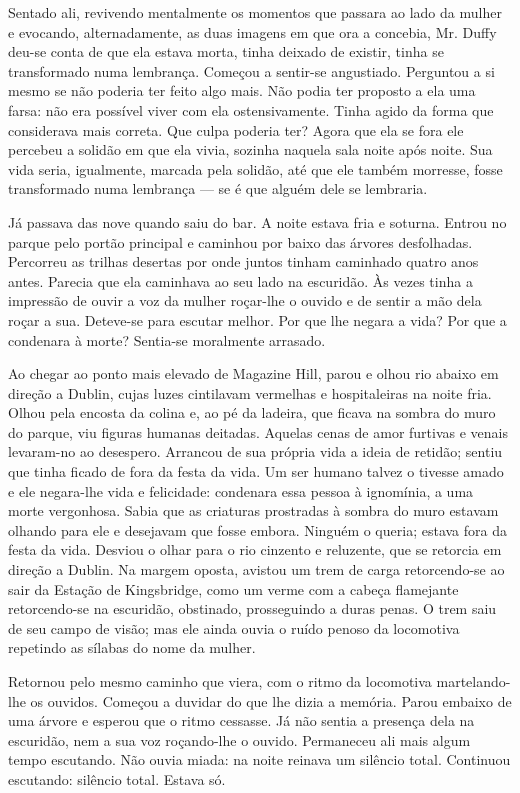 Sentado ali, revivendo mentalmente os momentos que passara ao lado da
mulher e evocando, alternadamente, as duas imagens em que ora a
concebia, Mr. Duffy deu-se conta de que ela estava morta, tinha
deixado de existir, tinha se transformado numa lembrança. Começou a
sentir-se angustiado. Perguntou a si mesmo se não poderia ter feito
algo mais. Não podia ter proposto a ela uma farsa: não era possível
viver com ela ostensivamente. Tinha agido da forma que considerava
mais correta. Que culpa poderia ter? Agora que ela se fora ele
percebeu a solidão em que ela vivia, sozinha naquela sala noite após
noite. Sua vida seria, igualmente, marcada pela solidão, até que ele
também morresse, fosse transformado numa lembrança --- se é que alguém
dele se lembraria.

Já passava das nove quando saiu do bar. A noite estava fria e soturna.
Entrou no parque pelo portão principal e caminhou por baixo das
árvores desfolhadas. Percorreu as trilhas desertas por onde juntos
tinham caminhado quatro anos antes. Parecia que ela caminhava ao seu
lado na escuridão. Às vezes tinha a impressão de ouvir a voz da
mulher roçar-lhe o ouvido e de sentir a mão dela roçar a sua.
Deteve-se para escutar melhor. Por que lhe negara a vida? Por que a
condenara à morte? Sentia-se moralmente arrasado.

Ao chegar ao ponto mais elevado de Magazine Hill, parou e olhou rio
abaixo em direção a Dublin, cujas luzes cintilavam vermelhas e
hospitaleiras na noite fria. Olhou pela encosta da colina e, ao pé da
ladeira, que ficava na sombra do muro do parque, viu figuras humanas
deitadas. Aquelas cenas de amor furtivas e venais levaram-no ao
desespero. Arrancou de sua própria vida a ideia de retidão; sentiu
que tinha ficado de fora da festa da vida. Um ser humano talvez o
tivesse amado e ele negara-lhe vida e felicidade: condenara essa
pessoa à ignomínia, a uma morte
vergonhosa. Sabia que as criaturas prostradas à sombra do muro estavam
olhando para ele e desejavam que fosse embora. Ninguém o queria;
estava fora da festa da vida. Desviou o olhar para o rio cinzento e
reluzente, que se retorcia em direção a Dublin. Na margem oposta,
avistou um trem de carga retorcendo-se ao sair da Estação de
Kingsbridge, como um verme com a cabeça flamejante retorcendo-se na
escuridão, obstinado, prosseguindo a duras penas. O trem saiu de seu
campo de visão; mas ele ainda ouvia o ruído penoso da locomotiva
repetindo as sílabas do nome da mulher.

Retornou pelo mesmo caminho que viera, com o ritmo da locomotiva
martelando-lhe os ouvidos. Começou a duvidar do que lhe dizia a
memória. Parou embaixo de uma árvore e esperou que o ritmo cessasse.
Já não sentia a presença dela na escuridão, nem a sua voz roçando-lhe
o ouvido. Permaneceu ali mais algum tempo escutando. Não ouvia miada:
na noite reinava um silêncio total. Continuou escutando: silêncio
total. Estava só.

